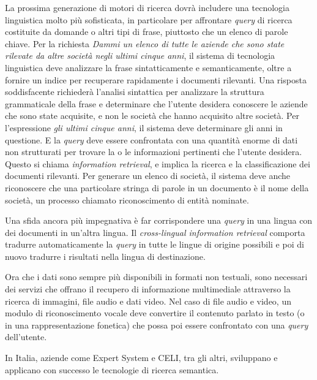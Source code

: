 \documentclass[]{../../metanetpaper}
\begin{document}
\begin{multicols}{2}
La prossima generazione di motori di ricerca dovr\`{a} includere una
tecnologia linguistica molto pi\`{u} sofisticata, in particolare per
affrontare \emph{query} di ricerca costituite da domande o altri tipi di
frase, piuttosto che un elenco di parole chiave. Per la richiesta \emph{Dammi un
elenco di tutte le aziende che sono state rilevate da altre societ\`{a} negli
ultimi cinque anni}, il sistema di tecnologia linguistica deve analizzare la
frase sintatticamente e semanticamente, oltre a fornire un indice per
recuperare rapidamente i documenti rilevanti. Una risposta soddisfacente
richieder\`{a} l'analisi sintattica per analizzare la struttura grammaticale
della frase e determinare che l'utente desidera conoscere le aziende che sono
state acquisite, e non le societ\`{a} che hanno acquisito altre
societ\`{a}. Per l'espressione \emph{gli ultimi cinque anni}, il sistema deve
determinare gli anni in questione. E la \emph{query} deve essere confrontata
con una quantit\`{a} enorme di dati non strutturati per trovare la o le
informazioni pertinenti che l'utente desidera. Questo si chiama
\emph{information retrieval}, e implica la ricerca e la classificazione dei 
documenti rilevanti. Per generare un elenco di societ\`{a}, il sistema deve 
anche riconoscere che una particolare stringa di parole in un documento \`{e} 
il nome della societ\`{a}, un processo chiamato riconoscimento di entit\`{a}
nominate.




Una sfida ancora pi\`{u} impegnativa \`{e} far corrispondere una \emph{query}
in una lingua con dei documenti in un'altra lingua. Il \emph{cross-lingual
  information retrieval} comporta tradurre automaticamente la \emph{query} in
tutte le lingue di origine possibili e poi di nuovo tradurre i risultati nella
lingua di destinazione.

Ora che i dati sono sempre pi\`{u} disponibili in formati non testuali, sono
necessari dei servizi che offrano il recupero di informazione multimediale
attraverso la ricerca di immagini, file audio e dati video. Nel caso di file
audio e video, un modulo di riconoscimento vocale deve convertire il contenuto
parlato in testo (o in una rappresentazione fonetica) che possa poi essere
confrontato con una \emph{query} dell'utente.

In Italia, aziende come Expert System e CELI, tra gli altri, sviluppano e
applicano con successo le tecnologie di ricerca semantica.




\end{multicols}
\end{document}
